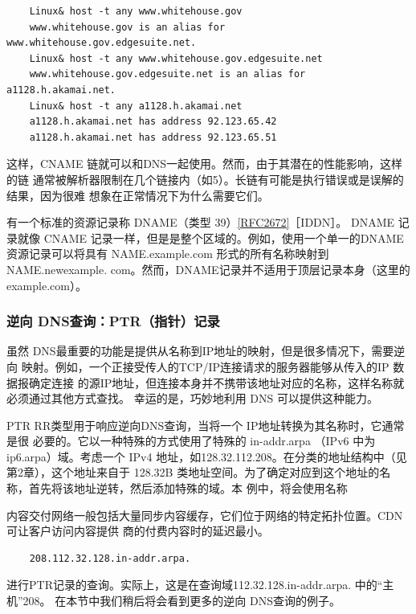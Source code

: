 \begin{verbatim}
    Linux& host -t any www.whitehouse.gov
    www.whitehouse.gov is an alias for www.whitehouse.gov.edgesuite.net.
    Linux& host -t any www.whitehouse.gov.edgesuite.net
    www.whitehouse.gov.edgesuite.net is an alias for a1128.h.akamai.net.
    Linux& host -t any a1128.h.akamai.net
    a1128.h.akamai.net has address 92.123.65.42
    a1128.h.akamai.net has address 92.123.65.51
\end{verbatim}

这样，CNAME 链就可以和DNS一起使用。然而，由于其潜在的性能影响，这样的链
通常被解析器限制在几个链接内（如5）。长链有可能是执行错误或是误解的结果，因为很难
想象在正常情况下为什么需要它们。

\begin{tcolorbox}
    有一个标准的资源记录称 DNAME（类型 39）\href{https://www.rfc-editor.org/rfc/rfc2672}{[RFC2672]}［IDDN］。 DNAME
    记录就像 CNAME 记录一样，但是是整个区域的。例如，使用一个单一的DNAME
    资源记录可以将具有 NAME.example.com 形式的所有名称映射到 NAME.newexample.
    com。然而，DNAME记录并不适用于顶层记录本身（这里的 example.com）。
\end{tcolorbox}

\subsubsection{逆向 DNS查询：PTR（指针）记录}

虽然 DNS最重要的功能是提供从名称到IP地址的映射，但是很多情况下，需要逆向
映射。例如，一个正接受传人的TCP/IP连接请求的服务器能够从传入的IP 数据报确定连接
的源IP地址，但连接本身并不携带该地址对应的名称，这样名称就必须通过其他方式查找。
幸运的是，巧妙地利用 DNS 可以提供这种能力。

PTR RR类型用于响应逆向DNS查询，当将一个 IP地址转换为其名称时，它通常是很
必要的。它以一种特殊的方式使用了特殊的 in-addr.arpa （IPv6 中为 ip6.arpa）域。考虑一个
IPv4 地址，如128.32.112.208。在分类的地址结构中（见第2章），这个地址来自于 128.32B
类地址空间。为了确定对应到这个地址的名称，首先将该地址逆转，然后添加特殊的域。本
例中，将会使用名称

 内容交付网络一般包括大量同步内容缓存，它们位于网络的特定拓扑位置。CDN 可让客户访问内容提供
商的付费内容时的延迟最小。

\begin{verbatim}
    208.112.32.128.in-addr.arpa.
\end{verbatim}

进行PTR记录的查询。实际上，这是在查询域112.32.128.in-addr.arpa. 中的“主机”208。
在本节中我们稍后将会看到更多的逆向 DNS查询的例子。

